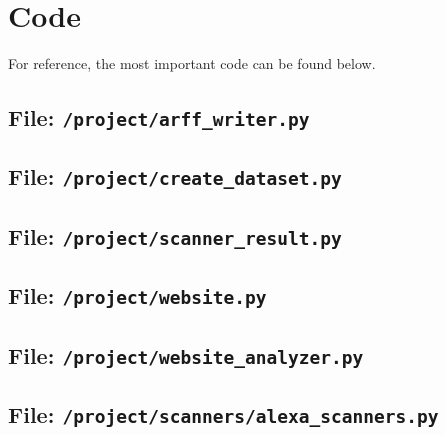 \newpage
\section{Code}
\label{apx:code}

For reference, the most important code can be found below.

\subsection{File: \texttt{/project/arff\_writer.py}}
\subsection{File: \texttt{/project/create\_dataset.py}}
\subsection{File: \texttt{/project/scanner\_result.py}}
\subsection{File: \texttt{/project/website.py}}
\subsection{File: \texttt{/project/website\_analyzer.py}}
\subsection{File: \texttt{/project/scanners/alexa\_scanners.py}}
